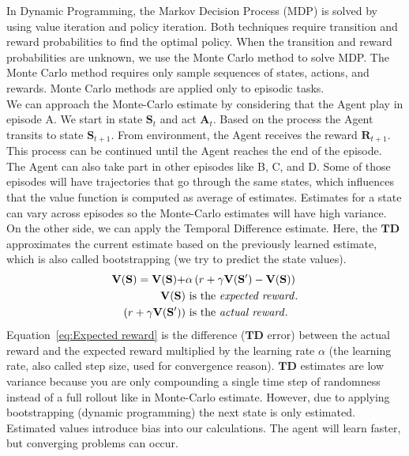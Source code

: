 In Dynamic Programming, the Markov Decision Process (MDP) is solved by using value iteration and policy iteration. Both techniques require transition and reward probabilities to find the optimal policy. When the transition and reward probabilities are unknown, we use the Monte Carlo method to solve MDP. The Monte Carlo method requires only sample sequences of states, actions, and rewards. Monte Carlo methods are applied only to episodic tasks.\\
We can approach the Monte-Carlo estimate by considering that the Agent play in episode A. We start in state $\mathbf{S}_t$ and act $\mathbf{A}_t$. Based on the process the Agent transits to state $\mathbf{S}_{t+1}$. From environment, the Agent receives the reward $\mathbf{R}_{t+1}$. This process can be continued until the Agent reaches the end of the episode. The Agent can also take part in other episodes like B, C, and D. Some of those episodes will have trajectories that go through the same states, which influences that the value function is computed as average of estimates. Estimates for a state can vary across episodes so the Monte-Carlo estimates will have high variance. \\
On the other side, we can apply the Temporal Difference estimate. Here, the $\mathbf{T}\mathbf{D}$ approximates the current estimate based on the previously learned estimate, which is also called bootstrapping (we try to predict the state values).
\begin{equation}
    \label{eq:Expected reward}
    \begin{aligned}
        \mathbf{V}(\mathbf{S}) = \mathbf{V}(\mathbf{S}) + & \alpha \left( r + \gamma \mathbf{V}(\mathbf{S}') - \mathbf{V}(\mathbf{S}) \right) \\
        \mathbf{V}(\mathbf{S}) & \text{ is the \emph{expected reward}}. \\
        \left( r + \gamma \mathbf{V}(\mathbf{S}') \right) & \text{ is the \emph{actual reward}}.
    \end{aligned}
\end{equation}
Equation~\ref{eq:Expected reward} is the difference ($\mathbf{T}\mathbf{D}$ error) between the actual reward and the expected reward multiplied by the learning rate $\alpha$ (the learning rate, also called step size, used for convergence reason).
$\mathbf{T}\mathbf{D}$ estimates are low variance because you are only compounding a single time step of randomness instead of a full rollout like in Monte-Carlo estimate. However, due to applying bootstrapping (dynamic programming) the next state is only estimated. Estimated values introduce bias into our calculations. The agent will learn faster, but converging problems can occur.
